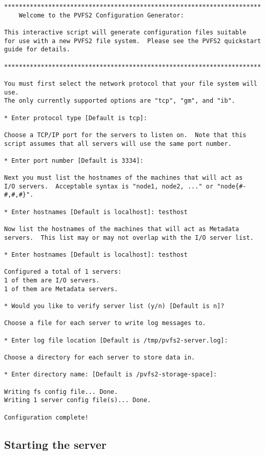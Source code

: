 \documentclass[11pt, letterpaper]{article}
\begin{document}
\begin{verbatim}
**********************************************************************
	Welcome to the PVFS2 Configuration Generator:

This interactive script will generate configuration files suitable
for use with a new PVFS2 file system.  Please see the PVFS2 quickstart
guide for details.

**********************************************************************

You must first select the network protocol that your file system will use.
The only currently supported options are "tcp", "gm", and "ib".

* Enter protocol type [Default is tcp]: 

Choose a TCP/IP port for the servers to listen on.  Note that this
script assumes that all servers will use the same port number.

* Enter port number [Default is 3334]: 

Next you must list the hostnames of the machines that will act as
I/O servers.  Acceptable syntax is "node1, node2, ..." or "node{#-#,#,#}".

* Enter hostnames [Default is localhost]: testhost

Now list the hostnames of the machines that will act as Metadata
servers.  This list may or may not overlap with the I/O server list.

* Enter hostnames [Default is localhost]: testhost

Configured a total of 1 servers:
1 of them are I/O servers.
1 of them are Metadata servers.

* Would you like to verify server list (y/n) [Default is n]? 

Choose a file for each server to write log messages to.

* Enter log file location [Default is /tmp/pvfs2-server.log]: 

Choose a directory for each server to store data in.

* Enter directory name: [Default is /pvfs2-storage-space]: 

Writing fs config file... Done.
Writing 1 server config file(s)... Done.

Configuration complete!
\end{verbatim}

\subsection{Starting the server}
\end{document}
